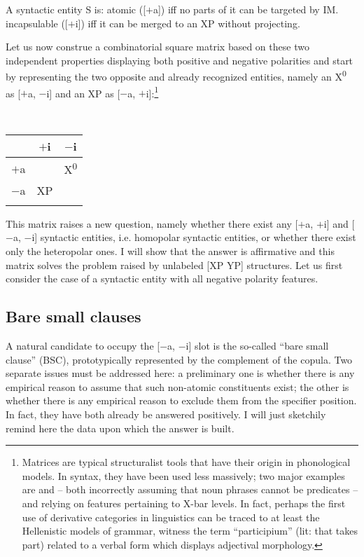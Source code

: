 \documentclass[output=paper]{langsci/langscibook}
\begin{document}
\ea A syntactic entity S is:
\label{ex:key:28.1}
	\ea atomic ([$+$a]) iff no parts of it can be targeted by \gls{IM}.
	\ex incapsulable ([$+$i]) iff it can be merged to an XP without projecting.
	\z
\z

Let us now construe a combinatorial square matrix based on these two
independent properties displaying both positive and negative polarities and
start by representing the two opposite and already recognized entities, namely
an X\textsuperscript{0} as [$+$a, $-$i] and  an XP as [$-$a, $+$i]:\footnote{Matrices
    are typical structuralist tools that have their origin in phonological
    models.  In syntax, they have been used less massively; two major examples
    are  and \citet{Jackendoff1977} -- both incorrectly
    assuming that noun phrases cannot be predicates -- and
    \citealt{MuyskenvanRiemsdijk1986} relying on features pertaining to X-bar
    levels. In fact, perhaps the first use of derivative categories in
    linguistics can be traced to at least the Hellenistic models of grammar,
witness the term “participium” (lit: that takes part) related to a verbal form
which displays adjectival morphology.}

\ea\label{ex:key:28.2}\leavevmode\\[-1\baselineskip]
    \begin{tabular}{ccc}
    \lsptoprule
    	        & $+$i & $-$i\\
    \midrule
    $+$a &             & X\textsuperscript{0}\\
    $-$a & XP          & \\
    \lspbottomrule
    \end{tabular}
\z

This matrix raises a new question, namely whether there exist any [$+$a, $+$i] and
[$-$a, $-$i] syntactic entities, i.e. homopolar syntactic entities, or whether
there exist only the heteropolar ones. I will show that the answer is
affirmative and this matrix solves the problem raised by unlabeled [XP YP]
structures.  Let us first consider the case of a syntactic entity with all
negative polarity features.

\subsection{Bare small clauses}

A natural candidate to occupy the [$-$a, $-$i] slot is the so-called “bare small
clause” (\gls{BSC}), prototypically represented by the complement
of the copula. Two separate issues must be addressed here: a preliminary one is
whether there is any empirical reason to assume that such non-atomic
constituents exist; the other is whether there is any empirical reason to
exclude them from the specifier position. In fact, they have both already be
answered positively.  I will just sketchily remind here the data upon which the
answer is built.\largerpage
\end{document}
